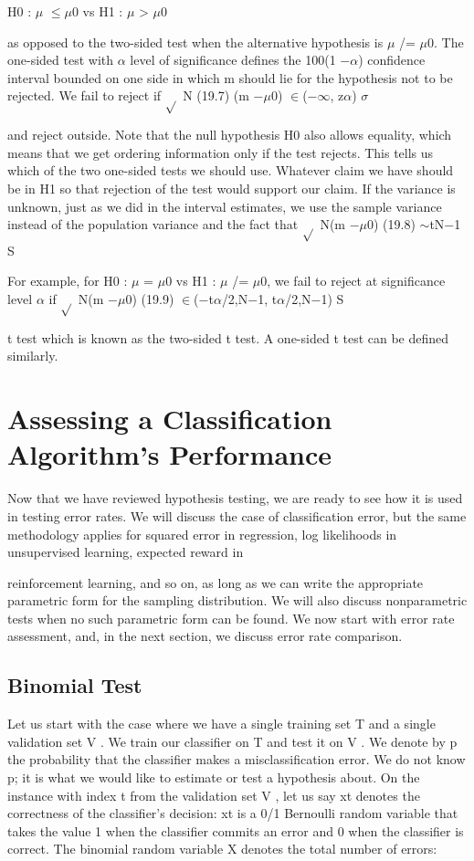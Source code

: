 H0 : $\mu$ $\leq$$\mu$0 vs H1 : $\mu$ > $\mu$0

as opposed to the two-sided test when the alternative hypothesis is $\mu$ /= $\mu$0. The one-sided test with $\alpha$ level of significance defines the 100(1 $-$$\alpha$) confidence interval bounded on one side in which m should lie for the hypothesis not to be rejected. We fail to reject if $\sqrt{}$ N (19.7) (m $-$$\mu$0) $\in$($-$$\infty$, z$\alpha$) $\sigma$

and reject outside. Note that the null hypothesis H0 also allows equality, which means that we get ordering information only if the test rejects. This tells us which of the two one-sided tests we should use. Whatever claim we have should be in H1 so that rejection of the test would support our claim. If the variance is unknown, just as we did in the interval estimates, we use the sample variance instead of the population variance and the fact that $\sqrt{}$ N(m $-$$\mu$0) (19.8) $\sim$tN$-$1 S

For example, for H0 : $\mu$ = $\mu$0 vs H1 : $\mu$ /= $\mu$0, we fail to reject at significance level $\alpha$ if $\sqrt{}$ N(m $-$$\mu$0) (19.9) $\in$($-$t$\alpha$/2,N$-$1, t$\alpha$/2,N$-$1) S

t test which is known as the two-sided t test. A one-sided t test can be defined similarly.

\section{Assessing a Classification Algorithm’s Performance}

Now that we have reviewed hypothesis testing, we are ready to see how it is used in testing error rates. We will discuss the case of classification error, but the same methodology applies for squared error in regression, log likelihoods in unsupervised learning, expected reward in

reinforcement learning, and so on, as long as we can write the appropriate parametric form for the sampling distribution. We will also discuss nonparametric tests when no such parametric form can be found. We now start with error rate assessment, and, in the next section, we discuss error rate comparison.

\subsection{Binomial Test}

Let us start with the case where we have a single training set T and a single validation set V . We train our classifier on T and test it on V . We denote by p the probability that the classifier makes a misclassification error. We do not know p; it is what we would like to estimate or test a hypothesis about. On the instance with index t from the validation set V , let us say xt denotes the correctness of the classifier’s decision: xt is a 0/1 Bernoulli random variable that takes the value 1 when the classifier commits an error and 0 when the classifier is correct. The binomial random variable X denotes the total number of errors:

